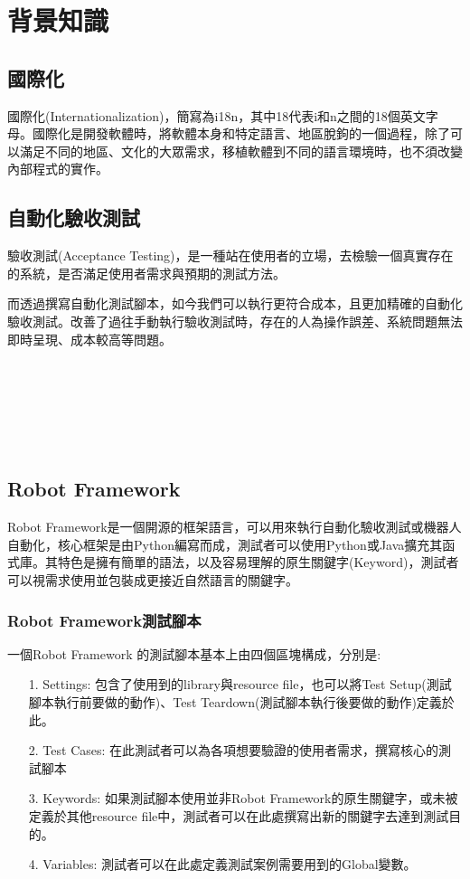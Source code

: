 \chapter{背景知識}

\section{國際化}
國際化(Internationalization)\cite{internationalization}，簡寫為i18n，其中18代表i和n之間的18個英文字母。國際化是開發軟體時，將軟體本身和特定語言、地區脫鉤的一個過程，除了可以滿足不同的地區、文化的大眾需求，移植軟體到不同的語言環境時，也不須改變內部程式的實作。

\section{自動化驗收測試}
驗收測試(Acceptance Testing)\cite{se}，是一種站在使用者的立場，去檢驗一個真實存在的系統，是否滿足使用者需求與預期的測試方法。

而透過撰寫自動化測試腳本\cite{AT}，如今我們可以執行更符合成本，且更加精確的自動化驗收測試。改善了過往手動執行驗收測試時，存在的人為操作誤差、系統問題無法即時呈現、成本較高等問題。

\hspace*{\fill} \\
\\ \hspace*{\fill} \\
\\ \hspace*{\fill} \\
\section{Robot Framework}
Robot Framework\cite{rf}\cite{rfguide}是一個開源的框架語言，可以用來執行自動化驗收測試或機器人自動化，核心框架是由Python\cite{python}編寫而成，測試者可以使用Python或Java擴充其函式庫。其特色是擁有簡單的語法，以及容易理解的原生關鍵字(Keyword)，測試者可以視需求使用並包裝成更接近自然語言的關鍵字。

\subsection{Robot Framework測試腳本}
一個Robot Framework 的測試腳本基本上由四個區塊構成，分別是:
\begin{itemize}
    \item[1.]Settings: 包含了使用到的library與resource file，也可以將Test Setup(測試腳本執行前要做的動作)、Test Teardown(測試腳本執行後要做的動作)定義於此。
    \item[2.]Test Cases: 在此測試者可以為各項想要驗證的使用者需求，撰寫核心的測試腳本
    \item[3.]Keywords: 如果測試腳本使用並非Robot Framework的原生關鍵字，或未被定義於其他resource file中，測試者可以在此處撰寫出新的關鍵字去達到測試目的。
    \item[4.]Variables: 測試者可以在此處定義測試案例需要用到的Global變數。 
\end{itemize}

